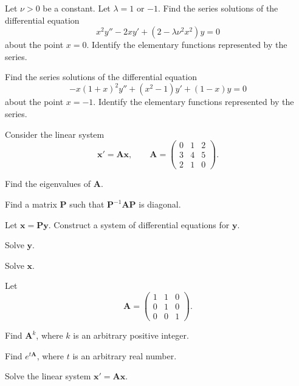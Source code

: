 \documentclass[11pt,oneside]{article}
\begin{document}
\begin{problem}
Let $\nu>0$ be a constant. Let $\lambda=1$ or $-1$. Find the series solutions of the differential equation
\[
x^2y''-2xy'+(2-\lambda\nu^2x^2)y=0
\]
about the point $x=0$. Identify the elementary functions represented by the series.
\end{problem}

\begin{problem}
Find the series solutions of the differential equation
\[
-x(1+x)^2y''+(x^2-1)y'+(1-x)y=0
\]
about the point $x=-1$. Identify the elementary functions represented by the series.
\end{problem}

\begin{problem}
Consider the linear system
\[
\mathbf x'=\mathbf A\mathbf x,
\qquad
\mathbf A=
\begin{pmatrix}
0&1&2\\
3&4&5\\
2&1&0
\end{pmatrix}.
\]
\begin{problemsubparts}
\item Find the eigenvalues of $\mathbf A$.
\item Find a matrix $\mathbf P$ such that $\mathbf P^{-1}\mathbf A\mathbf P$ is diagonal.
\item Let $\mathbf x=\mathbf P\mathbf y$. Construct a system of differential equations for $\mathbf y$.
\item Solve $\mathbf y$.
\item Solve $\mathbf x$.
\end{problemsubparts}
\end{problem}

\begin{problem}
Let
\[
\mathbf A=
\begin{pmatrix}
1&1&0\\
0&1&0\\
0&0&1
\end{pmatrix}.
\]
\begin{problemsubparts}
\item Find $\mathbf A^k$, where $k$ is an arbitrary positive integer.
\item Find $e^{t\mathbf A}$, where $t$ is an arbitrary real number.
\item Solve the linear system $\mathbf x'=\mathbf A\mathbf x$.
\end{problemsubparts}
\end{problem}
\end{document}
